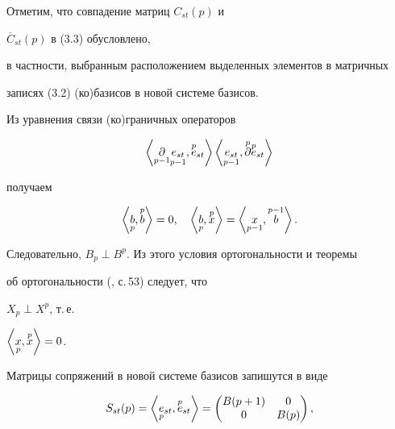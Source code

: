  


Отметим, что совпадение матриц $C_{st}(p)$ и 


$\overline C_{st}(p)$ в (3.3) обусловлено, 


в частности, выбранным расположением выделенных элементов в матричных 


записях (3.2) (ко)базисов в новой системе базисов. 


 


Из уравнения связи (ко)граничных операторов 


$$ 


\left\langle\down{p-1}{\partial}\down{p-1}{e_{st}},\up{p}{e}_{st} 


\right\rangle 


\left\langle\down{p-1}{e_{st}},\up{p}{\partial}\up{p}{e}_{st} 


\right\rangle 


$$ 


получаем 


$$ 


\left\langle\down{p}{b},\up{p}{b} \right\rangle=0,\quad 


\left\langle\down{p}{b},\up{p}{x}\right\rangle= 


\left\langle\down{p-1}{x},\up{p-1}{b} \right\rangle. 


$$ 


Следовательно, $B_p\perp B^p$. Из этого условия ортогональности и теоремы 


об ортогональности (\cite{Gla}, с.\,53) следует, что 


$X_p\perp X^p$, т.\,е. 


$\left\langle\underset{p}{x}{},\overset{p}{x}{}\right\rangle=0$. 


Матрицы сопряжений в новой системе базисов запишутся в виде 


\begin{equation} 


S_{st}(p)= 


\left\langle\down{p}{e}_{st},\up{p}{e}_{st}\right\rangle= 


\begin{pmatrix} 


B(p+1) & 0\\ 


0 & B(p) 


\end{pmatrix}, 


\end{equation} 


